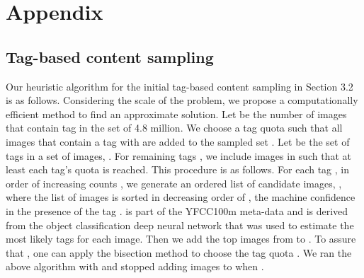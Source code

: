 \documentclass[10pt,journal,compsoc]{IEEEtran}
\begin{document}




\section{Appendix}
\subsection{Tag-based content sampling}

Our heuristic algorithm for the initial tag-based content sampling in Section 3.2 is as follows. Considering the scale of the problem, we propose a computationally efficient method to find an approximate solution. Let  be the number of images that contain tag  in the set  of 4.8 million. We choose a tag quota  such that all images that contain a tag  with  are added to the sampled set . Let  be the set of tags in a set of images, .  For remaining tags , we include images in  such that at least each tag's quota  is reached. This procedure is as follows. For each tag , in order of increasing counts , we generate an ordered list of candidate images, , where the list of images is sorted in decreasing order of  , the machine confidence in the presence of the tag .  is part of the YFCC100m meta-data and is derived from the object classification deep neural network that was used to estimate the most likely tags for each image. Then we add the top  images from  to . To assure that , one can apply the bisection method to choose the tag quota . We ran the above algorithm with  and stopped adding images to  when .
\end{document}
